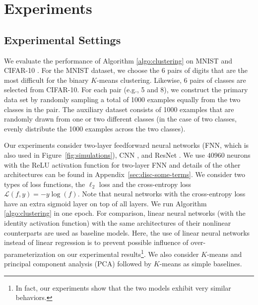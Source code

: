 \section{Experiments}
\label{sec:experiments}


\subsection{Experimental Settings}
\label{subsec:settings}

We evaluate the performance of Algorithm \ref{algo:clustering} on MNIST \citep{lecun1998mnist} and CIFAR-10 \citep{krizhevsky2009learning}. For the MNIST dataset, we choose the $6$ pairs of digits that are the most difficult for the binary $K$-means clustering. Likewise, $6$ pairs of classes are selected from CIFAR-10. For each pair (e.g., 5 and 8), we construct the primary data set by randomly sampling a total of 1000 examples equally from the two classes in the pair. The auxiliary dataset consists of 1000 examples that are randomly drawn from one or two different classes (in the case of two classes, evenly distribute the 1000 examples across the two classes). 


Our experiments consider two-layer feedforward neural networks (FNN, which is also used in Figure~\ref{fig:simulations}), CNN \citep{krizhevsky2012imagenet}, and ResNet \citep{he2016deep}. We use $40960$ neurons with the ReLU activation function for two-layer FNN and details of the other architectures can be found in Appendix~\ref{sec:disc-some-terms}.  We consider two types of loss functions, the $\ell_2$ loss and the cross-entropy loss $\mathcal{L}(f,y)=-y\log(f)$. Note that neural networks with the cross-entropy loss have an extra sigmoid layer on top of all layers. We run Algorithm \ref{algo:clustering} in one epoch. For comparison, linear neural networks (with the identity activation function) with the same architectures of their nonlinear counterparts are used as baseline models. Here, the use of linear neural networks instead of linear regression is to prevent possible influence of over-parameterization on our experimental results\footnote{In fact, our experiments show that the two
  models exhibit very similar behaviors.}. We also consider $K$-means and principal component analysis (PCA) followed by $K$-means as simple baselines.

